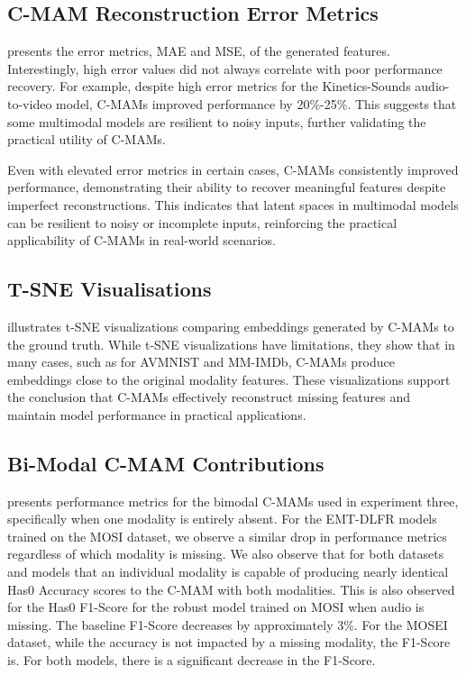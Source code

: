 \subsection{C-MAM Reconstruction Error Metrics}
 presents the error metrics, MAE and MSE, of the generated features. Interestingly, high error values did not always correlate with poor performance recovery. For example, despite high error metrics for the Kinetics-Sounds audio-to-video model, C-MAMs improved performance by 20\%-25\%. This suggests that some multimodal models are resilient to noisy inputs, further validating the practical utility of C-MAMs.



Even with elevated error metrics in certain cases, C-MAMs consistently improved performance, demonstrating their ability to recover meaningful features despite imperfect reconstructions. This indicates that latent spaces in multimodal models can be resilient to noisy or incomplete inputs, reinforcing the practical applicability of C-MAMs in real-world scenarios.

\subsection{T-SNE Visualisations}
illustrates t-SNE visualizations comparing embeddings generated by C-MAMs to the ground truth. While t-SNE visualizations have limitations, they show that in many cases, such as for AVMNIST and MM-IMDb, C-MAMs produce embeddings close to the original modality features. These visualizations support the conclusion that C-MAMs effectively reconstruct missing features and maintain model performance in practical applications.

\subsection{Bi-Modal C-MAM Contributions}
 presents performance metrics for the bimodal C-MAMs used in experiment three, specifically when one modality is entirely absent. For the EMT-DLFR models trained on the MOSI dataset, we observe a similar drop in performance metrics regardless of which modality is missing. We also observe that for both datasets and models that an individual modality is capable of producing nearly identical Has0 Accuracy scores to the C-MAM with both modalities. This is also observed for the Has0 F1-Score for the robust model trained on MOSI when audio is missing. The baseline F1-Score decreases by approximately 3\%. For the MOSEI dataset, while the accuracy is not impacted by a missing modality, the F1-Score is. For both models, there is a significant decrease in the F1-Score.

